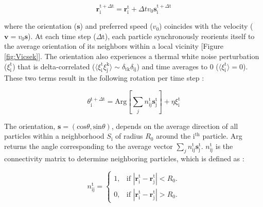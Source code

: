 \documentclass[11pt]{article}
\begin{document}
\begin{equation}\label{deflection}
    \boldsymbol{r}_\text{i}^{\text{t}+\Delta\text{t}} = \boldsymbol{r}_{\text{i}}^{\text{t}} + \Delta t v_0 
    \boldsymbol{s}_{\text{i}}^{\text{t} + \Delta\text{t}}
\end{equation}

\noindent where the orientation ($\boldsymbol{s}$) and preferred speed ($v_0$) coincides with the velocity ($\boldsymbol{v}=v_0 \boldsymbol{s}$).
At each time step ($\Delta\text{t}$), each particle synchronously reorients itself to the average orientation of its neighbors within a local vicinity [Figure \ref{fig:Vicsek}].  The orientation also experiences a thermal white noise perturbation ($\xi_\text{i}^\text{t}$) that is delta-correlated ($\langle\xi_\text{i}^\text{t}\xi_\text{j}^\text{k}\rangle \sim \delta_{\text{tk}}\delta_{\text{ij}}$) and time averages to 0 ($\langle\xi_\text{i}^\text{t}\rangle = 0$). These two terms result in the following rotation per time step  \cite{Ginelli}:

\begin{equation}\label{rot}
    \theta_\text{i}^{\text{t}+\Delta\text{t}}=\text{Arg}\left[\sum_j n_{\text{ij}}^\text{t}\boldsymbol{s}_\text{j}^\text{t}\right]+\eta\xi_\text{i}^\text{t}
\end{equation}

The orientation, $\boldsymbol{s}=(\text{cos}\theta,\text{sin}\theta)$, depends on the average direction of all particles within a neighborhood $S_\text{i}$ of radius $R_0$ around the $\text{i}^\text{th}$ particle.  Arg returns the angle corresponding to the average vector $\sum_j n_{\text{ij}}^\text{t}\boldsymbol{s}_\text{j}^\text{t}$. $n_{\text{ij}}^\text{t}$ is the connectivity matrix to determine neighboring particles, which is defined as \cite{Ginelli}:

\begin{equation}\label{conn}
  n_{\text{ij}}^\text{t}=\begin{cases}
    1, & \text{if $|\boldsymbol{r}_\text{i}^\text{t}-\boldsymbol{r}_\text{j}^\text{t}|<R_0$}.\\
    0, & \text{if $|\boldsymbol{r}_\text{i}^\text{t}-\boldsymbol{r}_\text{j}^\text{t}|>R_0$}.
  \end{cases}
\end{equation}
\end{document}

